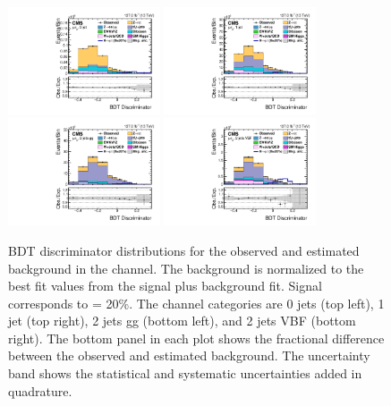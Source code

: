 \begin{figure}[htbp!]
  \centering
  \includegraphics[width=0.4\textwidth]{plots/chapter9/BDT/mue/0jet.pdf}
  \includegraphics[width=0.4\textwidth]{plots/chapter9/BDT/mue/1jet.pdf} \\
  \includegraphics[width=0.4\textwidth]{plots/chapter9/BDT/mue/2jet_gg.pdf}
  \includegraphics[width=0.4\textwidth]{plots/chapter9/BDT/mue/2jet_vbf.pdf} \\
  \caption{BDT discriminator distributions for the observed and estimated background in the \mue channel. The background is normalized to the best fit values from the signal plus background fit. Signal corresponds to \BHmt = 20\%. The \mue channel categories are 0 jets (top left), 1 jet (top right), 2 jets gg (bottom left), and 2 jets VBF (bottom right). The bottom panel in each plot shows the fractional difference between the observed and estimated background. The uncertainty band shows the statistical and systematic uncertainties added in quadrature.}
  \label{fig:bdt_mue}
\end{figure}

